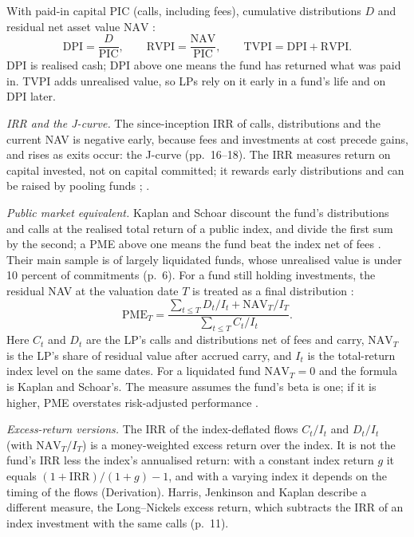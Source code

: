 \begin{qfmethod}\label{meth:private-fund-multiples-pme}
 With paid-in capital $\mathrm{PIC}$ (calls, including fees), cumulative distributions $D$ and residual net asset value $\mathrm{NAV}$ \citep[p.~19]{ippolito-private-capital-2020}:
\[ \mathrm{DPI}=\frac{D}{\mathrm{PIC}},\qquad \mathrm{RVPI}=\frac{\mathrm{NAV}}{\mathrm{PIC}},\qquad \mathrm{TVPI}=\mathrm{DPI}+\mathrm{RVPI}. \]
DPI is realised cash; DPI above one means the fund has returned what was paid in. TVPI adds unrealised value, so LPs rely on it early in a fund's life and on DPI later.

\emph{IRR and the J-curve.} The since-inception IRR of calls, distributions and the current NAV is negative early, because fees and investments at cost precede gains, and rises as exits occur: the J-curve (pp.~16--18). The IRR measures return on capital invested, not on capital committed; it rewards early distributions and can be raised by pooling funds \citep[pp.~598--600]{s7-ang}; \citep[pp.~68--69]{demaria-private-markets-2021}.

\emph{Public market equivalent.} Kaplan and Schoar discount the fund's distributions and calls at the realised total return of a public index, and divide the first sum by the second; a PME above one means the fund beat the index net of fees \citep[NBER WP 9807, pp.~6, 8]{pe-kaplan-schoar-2005}. Their main sample is of largely liquidated funds, whose unrealised value is under 10 percent of commitments (p.~6). For a fund still holding investments, the residual NAV at the valuation date $T$ is treated as a final distribution \citep[pp.~10--12]{pe-harris-jenkinson-kaplan-2014}:
\[ \mathrm{PME}_T=\frac{\sum_{t\le T} D_t/I_t+\mathrm{NAV}_T/I_T}{\sum_{t\le T} C_t/I_t}. \]
Here $C_t$ and $D_t$ are the LP's calls and distributions net of fees and carry, $\mathrm{NAV}_T$ is the LP's share of residual value after accrued carry, and $I_t$ is the total-return index level on the same dates. For a liquidated fund $\mathrm{NAV}_T=0$ and the formula is Kaplan and Schoar's. The measure assumes the fund's beta is one; if it is higher, PME overstates risk-adjusted performance \citep[pp.~8--9]{pe-kaplan-schoar-2005}.

\emph{Excess-return versions.} The IRR of the index-deflated flows $C_t/I_t$ and $D_t/I_t$ (with $\mathrm{NAV}_T/I_T$) is a money-weighted excess return over the index. It is not the fund's IRR less the index's annualised return: with a constant index return $g$ it equals $(1+\mathrm{IRR})/(1+g)-1$, and with a varying index it depends on the timing of the flows (Derivation). Harris, Jenkinson and Kaplan describe a different measure, the Long--Nickels excess return, which subtracts the IRR of an index investment with the same calls (p.~11).


\end{qfmethod}
